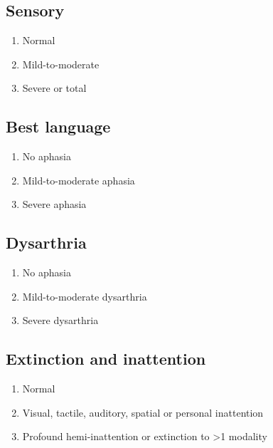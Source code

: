 \documentclass[8pt]{extarticle}
\begin{document}
\begin{multicols*}{2}
\subsection{Sensory}
\begin{enumerate}
    \item{Normal}
    \item{Mild-to-moderate}
    \item{Severe or total}
\end{enumerate}

\vspace{3mm}
\noindent{}

\subsection{Best language}
\begin{enumerate}
    \item{No aphasia}
    \item{Mild-to-moderate aphasia}
    \item{Severe aphasia}
\end{enumerate}

\subsection{Dysarthria}
\begin{enumerate}
    \item{No aphasia}
    \item{Mild-to-moderate dysarthria}
    \item{Severe dysarthria}
\end{enumerate}

\subsection{Extinction and inattention}
\begin{enumerate}
    \item{Normal}
    \item{Visual, tactile, auditory, spatial or personal inattention}
    \item{Profound hemi-inattention or extinction to >1 modality}
\end{enumerate}

\end{multicols*}
\end{document}
